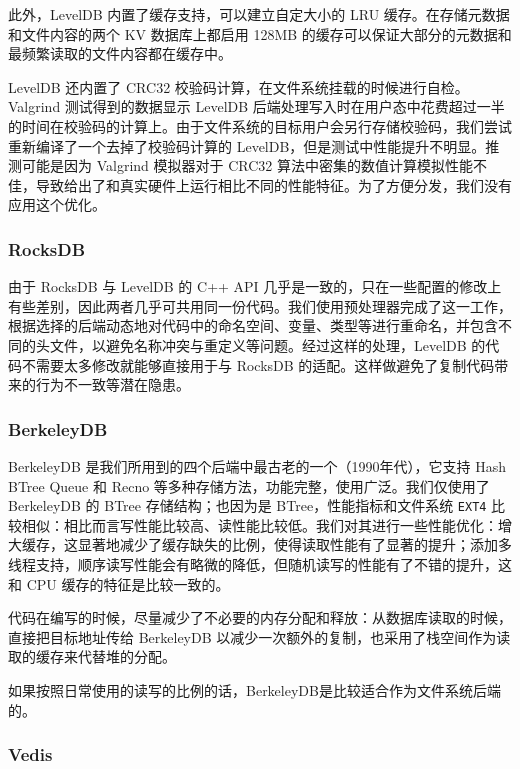 \documentclass{ctexart}
\begin{document}
此外，LevelDB 内置了缓存支持，可以建立自定大小的 LRU 缓存。在存储元数据和文件内容的两个 KV 数据库上都启用 128MB 的缓存可以保证大部分的元数据和最频繁读取的文件内容都在缓存中。

LevelDB 还内置了 CRC32 校验码计算，在文件系统挂载的时候进行自检。Valgrind 测试得到的数据显示 LevelDB 后端处理写入时在用户态中花费超过一半的时间在校验码的计算上。由于文件系统的目标用户会另行存储校验码，我们尝试重新编译了一个去掉了校验码计算的 LevelDB，但是测试中性能提升不明显。推测可能是因为 Valgrind 模拟器对于 CRC32 算法中密集的数值计算模拟性能不佳，导致给出了和真实硬件上运行相比不同的性能特征。为了方便分发，我们没有应用这个优化。

\subsubsection{RocksDB}

由于 RocksDB 与 LevelDB 的 C++ API 几乎是一致的，只在一些配置的修改上有些差别，因此两者几乎可共用同一份代码。我们使用预处理器完成了这一工作，根据选择的后端动态地对代码中的命名空间、变量、类型等进行重命名，并包含不同的头文件，以避免名称冲突与重定义等问题。经过这样的处理，LevelDB 的代码不需要太多修改就能够直接用于与 RocksDB 的适配。这样做避免了复制代码带来的行为不一致等潜在隐患。

\subsubsection{BerkeleyDB}

BerkeleyDB 是我们所用到的四个后端中最古老的一个（1990年代），它支持 Hash BTree Queue 和 Recno 等多种存储方法，功能完整，使用广泛。我们仅使用了 BerkeleyDB 的 BTree 存储结构；也因为是 BTree，性能指标和文件系统 \texttt{EXT4} 比较相似：相比而言写性能比较高、读性能比较低。我们对其进行一些性能优化：增大缓存，这显著地减少了缓存缺失的比例，使得读取性能有了显著的提升；添加多线程支持，顺序读写性能会有略微的降低，但随机读写的性能有了不错的提升，这和 CPU 缓存的特征是比较一致的。

代码在编写的时候，尽量减少了不必要的内存分配和释放：从数据库读取的时候，直接把目标地址传给 BerkeleyDB 以减少一次额外的复制，也采用了栈空间作为读取的缓存来代替堆的分配。

如果按照日常使用的读写的比例的话，BerkeleyDB是比较适合作为文件系统后端的。

\subsubsection{Vedis}
\end{document}
